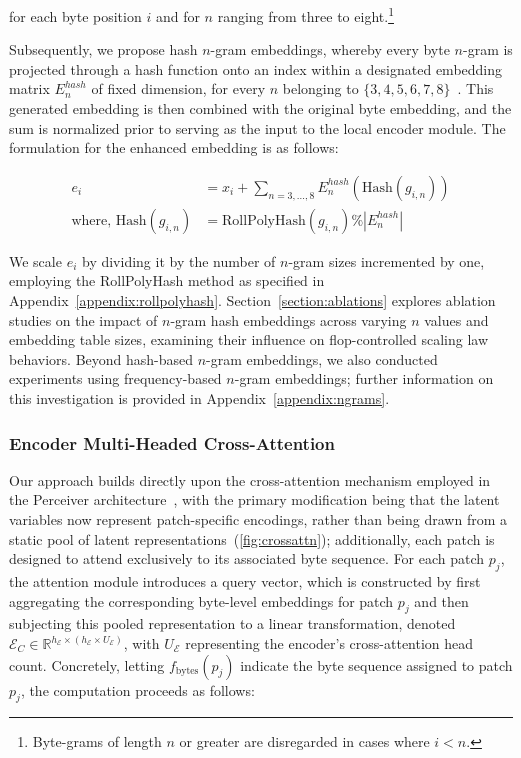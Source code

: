 for each byte position $i$ and for $n$ ranging from three to eight.\footnote{
Byte-grams of length $n$ or greater are disregarded in cases where $i<n$.}

Subsequently, we propose hash $n$-gram embeddings, whereby every byte $n$-gram is projected through a hash function onto an index within a designated embedding matrix $E_{n}^{hash}$ of fixed dimension, for every $n$ belonging to $\{3,4,5,6,7,8\}$~\citep{bai2010learning}. 
This generated embedding is then combined with the original byte embedding, and the sum is normalized prior to serving as the input to the local encoder module. The formulation for the enhanced embedding is as follows:

\begin{align}
e_i &= x_i + \sum_{n = 3,...,8}E_{n}^{hash}(\text{Hash}(g_{i,n})) \\
\text{where, Hash}(g_{i,n}) &= \text{RollPolyHash}(g_{i,n}) \% |E_{n}^{hash}|
\end{align}

We scale $e_i$ by dividing it by the number of $n$-gram sizes incremented by one, employing the RollPolyHash method as specified in Appendix~\ref{appendix:rollpolyhash}. Section~\ref{section:ablations} explores ablation studies on the impact of $n$-gram hash embeddings across varying $n$ values and embedding table sizes, examining their influence on flop-controlled scaling law behaviors. Beyond hash-based $n$-gram embeddings, we also conducted experiments using frequency-based $n$-gram embeddings; further information on this investigation is provided in Appendix~\ref{appendix:ngrams}.

\subsubsection{Encoder Multi-Headed Cross-Attention}
\label{sec:enc-cross-attn}
Our approach builds directly upon the cross-attention mechanism employed in the Perceiver architecture~\citep{jaegle2021perceiver}, with the primary modification being that the latent variables now represent patch-specific encodings, rather than being drawn from a static pool of latent representations~(\autoref{fig:crossattn}); additionally, each patch is designed to attend exclusively to its associated byte sequence. For each patch $p_j$, the attention module introduces a query vector, which is constructed by first aggregating the corresponding byte-level embeddings for patch $p_j$ and then subjecting this pooled representation to a linear transformation, denoted $\mathcal{E}_{C} \in \mathbb{R}^{h_{\mathcal{E}} \times (h_{\mathcal{E}} \times U_{\mathcal{E}})}$, with $U_{\mathcal{E}}$ representing the encoder’s cross-attention head count. Concretely, letting $f_{\text{bytes}}(p_j)$ indicate the byte sequence assigned to patch $p_j$, the computation proceeds as follows:

